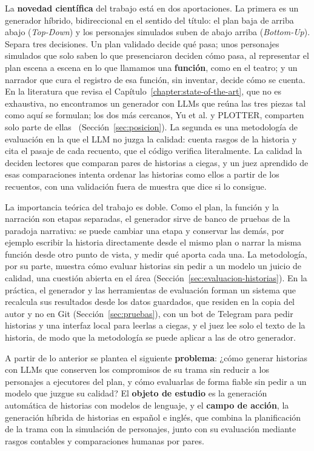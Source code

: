 \begin{introduction}
La \textbf{novedad científica} del trabajo está en dos aportaciones. La primera es un generador
híbrido, bidireccional en el sentido del título: el plan baja de arriba abajo
(\textit{Top-Down}) y los personajes simulados suben de abajo arriba (\textit{Bottom-Up}). Separa tres
decisiones. Un plan validado decide qué pasa; unos personajes simulados que
solo saben lo que presenciaron deciden cómo pasa, al representar el plan escena a escena en lo que
llamamos una \textbf{función}, como en el teatro; y un narrador que cura el registro de esa función,
sin inventar, decide cómo se cuenta. En la literatura que revisa el
Capítulo~\ref{chapter:state-of-the-art}, que no es exhaustiva, no encontramos un generador con LLMs
que reúna las tres piezas tal como aquí se formulan; los dos más cercanos, Yu et al. y PLOTTER,
comparten solo parte de ellas~\cite{yu2025,gu2026} (Sección~\ref{sec:posicion}). La segunda es una
metodología de evaluación en la que el LLM no juzga la calidad: cuenta rasgos de la historia y cita el
pasaje de cada recuento, que el código verifica literalmente. La calidad la deciden lectores que
comparan pares de historias a ciegas, y un juez aprendido de esas comparaciones intenta ordenar las
historias como ellos a partir de los recuentos, con una validación fuera de muestra que dice si lo
consigue.

La importancia teórica del trabajo es doble. Como el plan, la función y la narración son etapas
separadas, el generador sirve de banco de pruebas de la paradoja narrativa: se puede cambiar una
etapa y conservar las demás, por ejemplo escribir la historia directamente desde el mismo plan o
narrar la misma función desde otro punto de vista, y medir qué aporta cada una. La metodología, por
su parte, muestra cómo evaluar historias sin pedir a un modelo un juicio de calidad, una cuestión
abierta en el área (Sección~\ref{sec:evaluacion-historias}). En la práctica, el generador y las
herramientas de evaluación forman un sistema que recalcula sus resultados desde los datos guardados,
que residen en la copia del autor y no en Git (Sección~\ref{sec:pruebas}), con un bot de Telegram para pedir
historias y una interfaz local para leerlas a ciegas, y el juez lee solo el texto de la historia,
de modo que la metodología se puede aplicar a las de otro generador.

A partir de lo anterior se plantea el siguiente \textbf{problema}: ¿cómo generar historias con LLMs
que conserven los compromisos de su trama sin reducir a los personajes a ejecutores del plan, y cómo
evaluarlas de forma fiable sin pedir a un modelo que juzgue su calidad? El \textbf{objeto de
estudio} es la generación automática de historias con modelos de lenguaje, y el \textbf{campo de
acción}, la generación híbrida de historias en español e inglés, que combina la planificación de la trama
con la simulación de personajes, junto con su evaluación mediante rasgos contables y comparaciones
humanas por pares.


\end{introduction}
